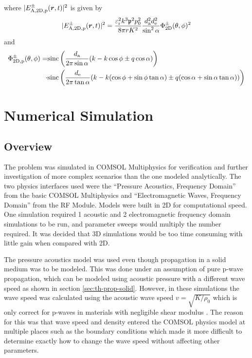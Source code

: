 \documentclass[11pt,twoside]{eitExjobb}
\begin{document}
	where $|E_{\mathrm{A,2D,p}}^\pm (\bm{r},t)|^2$ is given by
	\begin{equation*}
		|E_{\mathrm{A,2D,p}}^\pm (\bm{r},t)|^2 = \frac{\varepsilon_{\mathrm{r}}^2 k^3 \mathfrak{p}^2 p_0^2}{8\pi r K^2} \frac{d_{\mathrm{a}}^2 d_{\mathrm{e}}^2}{\sin^2{\alpha}} \Phi_{\mathrm{2D}}^\pm (\theta,\phi)^2
	\end{equation*}
	and
	\begin{equation*}
	\begin{split}
		\Phi_{\mathrm{2D,p}}^\pm (\theta,\phi) = &\text{sinc}\left( \frac{d_{\mathrm{a}}}{2\pi \sin{\alpha}}(k - k\cos{\phi} \pm q\cos{\alpha}) \right) \\
		\cdot &\text{sinc}\left( \frac{d_{\mathrm{e}}}{2\pi \tan{\alpha}}
		(k - k(\cos{\phi} + \sin{\phi}\tan{\alpha}) \pm q(\cos{\alpha} + \sin{\alpha}\tan{\alpha})) \right)
	\end{split}
	\end{equation*}
	
	
	\chapter{Numerical Simulation}
	
	\section{Overview}
	The problem was simulated in COMSOL Multiphysics for verification and further investigation of more complex scenarios than the one modeled analytically. The two physics interfaces used were the ``Pressure Acoustics, Frequency Domain'' from the basic COMSOL Multiphysics and ``Electromagnetic Waves, Frequency Domain'' from the RF Module. Models were built in 2D for computational speed. One simulation required 1 acoustic and 2 electromagnetic frequency domain simulations to be run, and parameter sweeps would multiply the number required. It was decided that 3D simulations would be too time consuming with little gain when compared with 2D. 
	
	The pressure acoustics model was used even though propagation in a solid medium was to be modeled. This was done under an assumption of pure p-wave propagation, which can be modeled using acoustic pressure with a different wave speed as shown in section \ref{sec:th-prop-solid}. However, in these simulations the wave speed was calculated using the acoustic wave speed $v = \sqrt{K/\rho_0}$ which is only correct for p-waves in materials with negligible shear modulus \cite{Schmerr2016}. The reason for this was that wave speed and density entered the COMSOL physics model at multiple places such as the boundary conditions which made it more difficult to determine exactly how to change the wave speed without affecting other parameters. 
	
\end{document}
